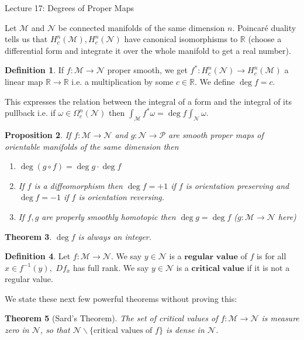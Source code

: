 \documentclass[10pt]{article}
\theoremstyle{plain}
\newtheorem{thm}{Theorem}[section] %
\newtheorem{prop}[thm]{Proposition}
\theoremstyle{definition}
\newtheorem{defn}[thm]{Definition} %
\newcommand{\Real}{\mathbb{R}}
\newcommand{\man}{\mathcal{M}}
\newcommand{\nan}{\mathcal{N}}
\newcommand{\pan}{\mathcal{P}}
\newcommand{\compactpformnan}[1]{\Omega^{#1}_c(\nan)}
\newcommand{\compactcohomman}[1]{H_c^{#1}(\man)}
\newcommand{\compactcohomnan}[1]{H_c^{#1}(\nan)}
\begin{document}
\begin{section}{Lecture 17: Degrees of Proper Maps}

Let $\man$ and $\nan$ be connected manifolds of the same dimension $n$. Poincar\'e duality tells us that $\compactcohomman{n},\compactcohomnan{n}$ have canonical isomorphisms to $\Real$ (choose a differential form and integrate it over the whole manifold to get a real number).
\begin{defn}
If $f:\man \to \nan$ proper smooth, we get $f^*: \compactcohomnan{n} \to \compactcohomman{n}$ a linear map $\Real \to \Real$ i.e. a multiplication by some $c\in \Real$. We define $\deg f = c$.
\end{defn}
This expresses the relation between the integral of a form and the integral of its pullback i.e. if $\omega\in\compactpformnan{n}$ then $\int_\man f^*\omega = \deg f \int_\nan \omega$.
\begin{prop}
If $f : \man \to \nan$ and $g: \nan \to \pan$ are smooth proper maps of orientable manifolds of the same dimension then
\begin{enumerate}
    \item $\deg (g\circ f) = \deg g \cdot \deg f$
    \item If $f$ is a diffeomorphism then $\deg f = +1$ if $f$ is orientation preserving and $\deg f = -1$ if $f$ is orientation reversing.
    \item If $f,g$ are properly smoothly homotopic then $\deg g = \deg f$ ($g : \man \to \nan $ here)
\end{enumerate}
\end{prop}

\begin{thm}\label{thm:DegreeInteger}
$\deg f$ is always an integer.
\end{thm}

\begin{defn}
Let $f:\man\to\nan$. We say $y\in \nan$ is a $\textbf{regular value}$ of $f$ is for all $x\in f^{-1}(y),$ $Df_x$ has full rank. We say $y\in\nan$ is a $\textbf{critical value}$ if it is not a regular value.
\end{defn}
We state these next few powerful theorems without proving this:
\begin{thm}[Sard's Theorem]
The set of critical values of $f : \man \to \nan$ is measure zero in $\nan$, so that $\nan \backslash \{\text{critical values of } f\}$ is dense in $\nan$.
\end{thm}


\end{section}
\end{document}
